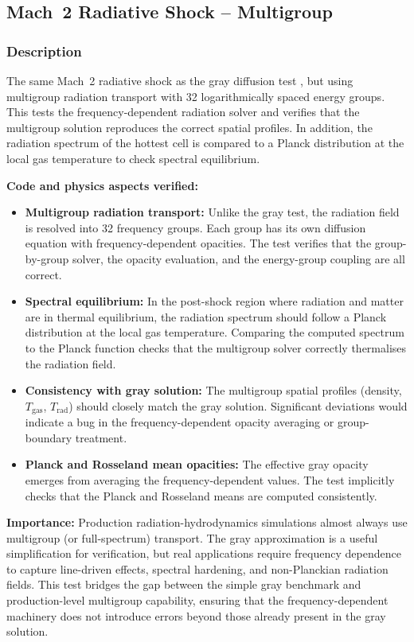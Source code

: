 \documentclass[11pt,a4paper]{article}
\begin{document}
\newpage

\subsection{Mach~2 Radiative Shock -- Multigroup}
\label{sec:mach2_multigroup}

\subsubsection*{Description}
The same Mach~2 radiative shock as the gray diffusion test \cite{lowrie2008,lowrie1999}, but using multigroup radiation transport with 32 logarithmically spaced energy groups. This tests the frequency-dependent radiation solver and verifies that the multigroup solution reproduces the correct spatial profiles. In addition, the radiation spectrum of the hottest cell is compared to a Planck distribution at the local gas temperature to check spectral equilibrium.

\textbf{Code and physics aspects verified:}
\begin{itemize}
  \item \textbf{Multigroup radiation transport:} Unlike the gray test, the radiation field is resolved into 32 frequency groups. Each group has its own diffusion equation with frequency-dependent opacities. The test verifies that the group-by-group solver, the opacity evaluation, and the energy-group coupling are all correct.
  \item \textbf{Spectral equilibrium:} In the post-shock region where radiation and matter are in thermal equilibrium, the radiation spectrum should follow a Planck distribution at the local gas temperature. Comparing the computed spectrum to the Planck function checks that the multigroup solver correctly thermalises the radiation field.
  \item \textbf{Consistency with gray solution:} The multigroup spatial profiles (density, $T_{\mathrm{gas}}$, $T_{\mathrm{rad}}$) should closely match the gray solution. Significant deviations would indicate a bug in the frequency-dependent opacity averaging or group-boundary treatment.
  \item \textbf{Planck and Rosseland mean opacities:} The effective gray opacity emerges from averaging the frequency-dependent values. The test implicitly checks that the Planck and Rosseland means are computed consistently.
\end{itemize}

\textbf{Importance:} Production radiation-hydrodynamics simulations almost always use multigroup (or full-spectrum) transport. The gray approximation is a useful simplification for verification, but real applications require frequency dependence to capture line-driven effects, spectral hardening, and non-Planckian radiation fields. This test bridges the gap between the simple gray benchmark and production-level multigroup capability, ensuring that the frequency-dependent machinery does not introduce errors beyond those already present in the gray solution.
\end{document}
